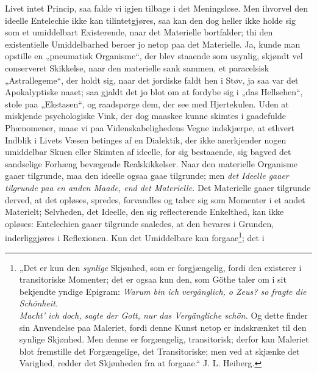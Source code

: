 \documentclass[12pt,a4paper]{book}
\begin{document}
\setcounter{footnote}{0}
Livet intet Princip, saa falde vi igjen tilbage i det Meningsløse. Men
ihvorvel den ideelle Entelechie ikke kan tilintetgjøres, saa kan den dog
heller ikke holde sig som et umiddelbart Existerende, naar det Materielle
bortfalder; thi den existentielle Umiddelbarhed beroer jo netop paa det
Materielle. Ja, kunde man opstille en „pneumatisk Organisme“, der blev
staaende som usynlig, skjøndt vel conserveret Skikkelse, naar den
materielle sank sammen, et paracelsisk „Astrallegeme“, der holdt sig, naar
det jordiske faldt hen i Støv, ja saa var det Apokalyptiske naaet; saa
gjaldt det jo blot om at fordybe sig i „das Hellsehen“, stole paa
„Ekstasen“, og raadspørge dem, der see med Hjertekulen. Uden at miskjende
psychologiske Vink, der dog maaskee kunne skimtes i gaadefulde Phænomener,
maae vi paa Videnskabelighedens Vegne indskjærpe, at ethvert Indblik i
Livets Væsen betinges af en Dialektik, der ikke anerkjender nogen
umiddelbar Skuen eller Skimten af ideelle, for sig bestaaende, sig bagved
det sandselige Forhæng bevægende Realskikkelser. Naar den materielle
Organisme gaaer tilgrunde, maa den ideelle ogsaa gaae tilgrunde; men
\emph{det Ideelle gaaer tilgrunde paa en anden Maade, end det Materielle.}
Det Materielle gaaer tilgrunde derved, at det opløses, spredes, forvandles
og taber sig som Momenter i et andet Materielt; Selvheden, det Ideelle,
den sig reflecterende Enkelthed, kan ikke opløses: Entelechien gaaer
tilgrunde saaledes, at den bevares i Grunden, inderliggjøres i
Reflexionen. Kun det Umiddelbare kan forgaae\footnote{„Det er kun den
\emph{synlige} Skjønhed, som er forgjængelig, fordi den existerer i
transitoriske Momenter; det er ogsaa kun den, som Göthe taler om i sit
bekjendte yndige Epigram:
\emph{Warum bin ich vergänglich, o Zeus? so fragte die Schönheit.\\
Macht' ich doch, sagte der Gott, nur das Vergängliche schön.}
Og dette finder sin Anvendelse paa Maleriet, fordi denne Kunst netop er
indskrænket til den synlige Skjønhed. Men denne er forgængelig,
transitorisk; derfor kan Maleriet blot fremstille det Forgængelige, det
Transitoriske; men ved at skjænke det Varighed, redder det Skjønheden fra
at forgaae.“ J. L. Heiberg.}; det i
\end{document}
